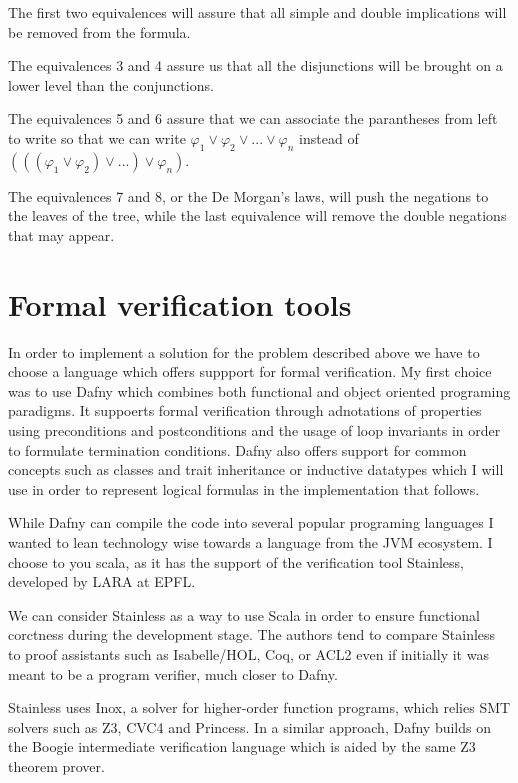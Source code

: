 The first two equivalences will assure that all simple and double implications will be removed from the formula.

The equivalences 3 and 4 assure us that all the disjunctions will be brought on a lower level than the conjunctions.

The equivalences 5 and 6 assure that we can associate the parantheses from left to write so that we can write 
$\varphi_1 \lor \varphi_2 \lor  . . . \lor \varphi_n$ instead of
$(((\varphi_1 \lor \varphi_2) \lor  . . .) \lor \varphi_n)$. 

The equivalences 7 and 8, or the De Morgan's laws, will push the negations to the leaves of the tree,
while the last equivalence will remove the double negations that may appear.

\section{Formal verification tools}

In order to implement a solution for the problem described above we have to choose a language which
offers suppport for formal verification. My first choice was to use Dafny which combines both functional
and object oriented programing paradigms. It suppoerts formal verification through adnotations of properties
using preconditions and postconditions and the usage of loop invariants in order to formulate termination conditions.
Dafny also offers support for common concepts such as classes and trait inheritance or inductive datatypes which I will
use in order to represent logical formulas in the implementation that follows.

While Dafny can compile the code into several popular programing languages I wanted to lean technology wise
towards a language from the JVM ecosystem. I choose to you scala, as it has the support of the verification tool 
Stainless, developed by LARA at EPFL. \cite{stainless_home}

We can consider Stainless as a way to use Scala in order to ensure functional corctness during the development stage.
The authors tend to compare Stainless to proof assistants such as Isabelle/HOL, Coq, or ACL2 even if initially it was meant
to be a program verifier, much closer to Dafny. \cite{stainless_home}

Stainless uses Inox, a solver for higher-order function programs, which relies SMT solvers such as Z3, CVC4 and Princess.
In a similar approach, Dafny builds on the Boogie intermediate verification language\cite{boogie_docs}
which is aided by the same Z3 theorem prover.


